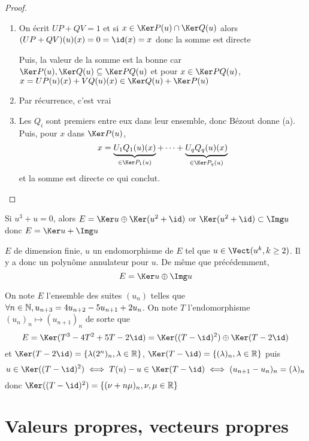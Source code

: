 \begin{proof}~
    \begin{enumerate}
        \item On écrit $UP+QV=1$ et si $x\in\Ker P(u)\cap \Ker Q(u)$ alors $(UP+QV)(u)(x)=0=\id(x)=x$ donc la somme est directe

            Puis, la valeur de la somme est la bonne car $\Ker P(u),\Ker Q(u)\subseteq \Ker PQ(u)$ et pour $x\in \Ker PQ(u)$, $x=UP(u)(x)+VQ(u)(x)\in \Ker Q(u)+\Ker P(u)$
        \item Par récurrence, c'est vrai
        \item Les $Q_i$ sont premiers entre eux dans leur ensemble, donc Bézout donne (a). Puis, pour $x$ dans $\Ker P(u)$, \[
                x= \underbrace{U_1Q_1(u)(x)}_{\in\Ker P_1(u)}+\cdots +\underbrace{U_qQ_q(u)(x)}_{\in\Ker P_q(u)}
            \]
            et la somme est directe ce qui conclut.
    \end{enumerate}
\end{proof}

\begin{ex}
    Si $u^3+u=0$, alors $E=\Ker u\oplus \Ker(u^2+\id)$ or $\Ker(u^2+\id)\subset \Img u$ donc $E=\Ker u+\Img u$
\end{ex}

\begin{ex}
    $E$ de dimension finie, $u$ un endomorphisme de $E$ tel que $u\in\Vect(u^k, k\geq 2)$. Il y a donc un polynôme annulateur pour $u$. De même que précédemment, \[
        E=\Ker u\oplus \Img u
    \]
\end{ex}

\begin{ex}
    On note $E$ l'ensemble des suites $(u_n)$ telles que $\forall n\in\mathbb N, u_{n+3}=4u_{n+2}-5u_{n+1}+2u_n$. On note $T$ l'endomorphisme $(u_n)_n\longmapsto (u_{n+1})_n$ de sorte que \[
        E=\Ker(T^3-4T^2+5T-2\id)=\Ker((T-\id)^2)\oplus \Ker(T-2\id)
    \]
    et $\Ker(T-2\id)=\{\lambda (2^n)_n, \lambda\in\R\}$, $\Ker(T-\id)=\{(\lambda)_n, \lambda\in\R\}$ puis \[
        u\in \Ker((T-\id)^2)\iff T(u)-u\in\Ker(T-\id)\iff (u_{n+1}-u_n)_n=(\lambda)_n
    \]
    donc $\Ker((T-\id)^2)=\{(\nu+n\mu)_n, \nu, \mu\in\R\}$
\end{ex}

\section{Valeurs propres, vecteurs propres}

